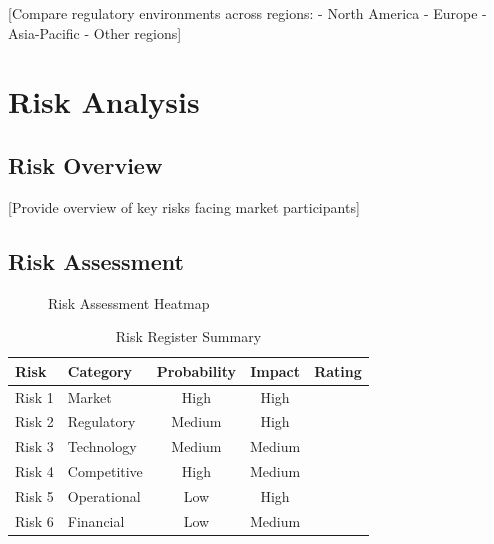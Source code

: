 \documentclass[11pt,letterpaper]{report}
\begin{document}
[Compare regulatory environments across regions:
- North America
- Europe
- Asia-Pacific
- Other regions]

\chapter{Risk Analysis}

\section{Risk Overview}

[Provide overview of key risks facing market participants]

\section{Risk Assessment}


\begin{figure}[htbp]
\centering
\caption{Risk Assessment Heatmap}
\label{fig:risk_heatmap}
\end{figure}

\begin{table}[htbp]
\centering
\caption{Risk Register Summary}
\begin{tabular}{@{}llccl@{}}
\toprule
\textbf{Risk} & \textbf{Category} & \textbf{Probability} & \textbf{Impact} & \textbf{Rating} \\
\midrule
Risk 1 & Market & High & High & \riskhigh{} \\
\rowcolor{tablealt} Risk 2 & Regulatory & Medium & High & \riskhigh{} \\
Risk 3 & Technology & Medium & Medium & \riskmedium{} \\
\rowcolor{tablealt} Risk 4 & Competitive & High & Medium & \riskmedium{} \\
Risk 5 & Operational & Low & High & \riskmedium{} \\
\rowcolor{tablealt} Risk 6 & Financial & Low & Medium & \risklow{} \\
\bottomrule
\end{tabular}
\label{tab:risk_register}
\end{table}
\end{document}

